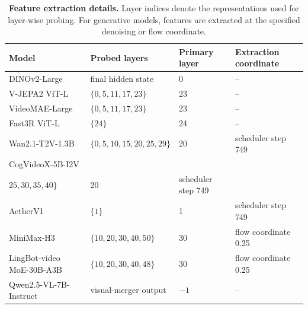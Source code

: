 \documentclass{article} %
\begin{document}
\begin{table}[t]
  \centering
  \small
  \setlength{\tabcolsep}{5pt}
  \begin{tabularx}{\textwidth}{
    @{}p{}
    X
    p{}
    p{}@{}
  }
    \toprule
    \textbf{Model} &
    \textbf{Probed layers} &
    \textbf{Primary layer} &
    \textbf{Extraction coordinate} \\
    \midrule

    DINOv2-Large
      & final hidden state
      & 0
      & -- \\

    V-JEPA2 ViT-L
      & $\{0,5,11,17,23\}$
      & 23
      & -- \\

    VideoMAE-Large
      & $\{0,5,11,17,23\}$
      & 23
      & -- \\

    Fast3R ViT-L
      & $\{24\}$
      & 24
      & -- \\

    Wan2.1-T2V-1.3B
      & $\{0,5,10,15,20,25,29\}$
      & 20
      & scheduler step 749 \\

    CogVideoX-5B-I2V
      & \makecell[l]{$\{0,5,10,15,20,$\\$25,30,35,40\}$}
      & 20
      & scheduler step 749 \\

    AetherV1
      & $\{1\}$
      & 1
      & scheduler step 749 \\

    MiniMax-H3
      & $\{10,20,30,40,50\}$
      & 30
      & flow coordinate 0.25 \\

    LingBot-video MoE-30B-A3B
      & $\{10,20,30,40,48\}$
      & 30
      & flow coordinate 0.25 \\

    Qwen2.5-VL-7B-Instruct
      & visual-merger output
      & $-1$
      & -- \\

    \bottomrule
  \end{tabularx}

  \caption{\textbf{Feature extraction details.}
  Layer indices denote the representations used for layer-wise probing.
  For generative models, features are extracted at the specified
  denoising or flow coordinate.}
  \label{tab:extraction-details}
\end{table}
\end{document}
